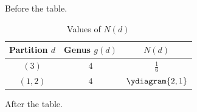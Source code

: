 \documentclass{article}
\begin{document}
Before the table.
\begin{table}[htbp]
\centering
\caption{Values of \(N(d)\)}
\label{tab:values}
\begin{tabular}{@{}ccc@{}}
\toprule
Partition \(d\) & Genus \(g(d)\) & \(N(d)\) \\
\midrule
\((3)\) & \(4\) & \(\frac{1}{6}\) \\
\((1,2)\) & \(4\) & \(\ydiagram{2,1}\) \\
\bottomrule
\end{tabular}
\end{table}
After the table.
\end{document}
